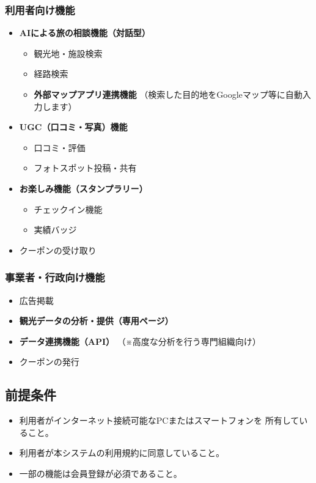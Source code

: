 \documentclass{docs}
\begin{document}
\subsubsection{利用者向け機能}
\begin{itemize}
    \item \textbf{AIによる旅の相談機能（対話型）}
    \begin{itemize}
        \item 観光地・施設検索
        \item 経路検索
        \item \textbf{外部マップアプリ連携機能}
         （検索した目的地をGoogleマップ等に自動入力します）
    \end{itemize}
    \item \textbf{UGC（口コミ・写真）機能}
    \begin{itemize}
        \item 口コミ・評価
        \item フォトスポット投稿・共有
    \end{itemize}
    \item \textbf{お楽しみ機能（スタンプラリー）}
    \begin{itemize}
        \item チェックイン機能
        \item 実績バッジ
    \end{itemize}
    \item クーポンの受け取り
\end{itemize}

\subsubsection{事業者・行政向け機能}
\begin{itemize}
    \item 広告掲載
    \item \textbf{観光データの分析・提供（専用ページ）}
    \item \textbf{データ連携機能（API）}
     （※高度な分析を行う専門組織向け）
    \item クーポンの発行
\end{itemize}

\subsection{前提条件}
\begin{itemize}
    \item 利用者がインターネット接続可能なPCまたはスマートフォンを
    所有していること。
    \item 利用者が本システムの利用規約に同意していること。
    \item 一部の機能は会員登録が必須であること。
\end{itemize}
\end{document}
